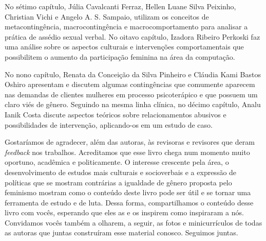 No sétimo capítulo, Júlia Cavalcanti Ferraz, Hellen Luane Silva Peixinho, Christian Vichi e Angelo A. S. Sampaio, utilizam os conceitos de metacontingência, macrocontingência e macrocomportamento para analisar a prática de assédio sexual verbal. No oitavo capítulo, Izadora Ribeiro Perkoski faz uma análise sobre os aspectos culturais e intervenções comportamentais que possibilitem o aumento da participação feminina na área da computação. 

No nono capítulo, Renata da Conceição da Silva Pinheiro e Cláudia Kami Bastos Oshiro apresentam e discutem algumas contingências que comumente aparecem nas demandas de clientes mulheres em processo psicoterápico e que possuem um claro viés de gênero. Seguindo na mesma linha clínica, no décimo capítulo, Analu Ianik Costa discute aspectos teóricos sobre relacionamentos abusivos e possibilidades de intervenção, aplicando-os em um estudo de caso.

Gostaríamos de agradecer, além das autoras, às revisoras e revisores que deram \textit{feedback} nos trabalhos. Acreditamos que esse livro chega num momento muito oportuno, acadêmica e politicamente. O interesse crescente pela área, o desenvolvimento de estudos mais culturais e socioverbais e a expressão de políticas que se mostram contrárias a igualdade de gênero proposta pelo feminismo mostram como o conteúdo deste livro pode ser útil e se tornar uma ferramenta de estudo e de luta. Dessa forma, compartilhamos o conteúdo desse livro com vocês, esperando que eles as e os inspirem como inspiraram a nós. Convidamos vocês também a olharem, a seguir, as fotos e minicurrículos de todas as autoras que juntas construíram esse material conosco. Seguimos juntas.